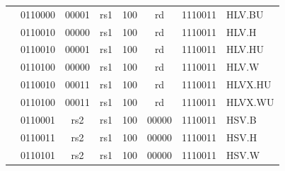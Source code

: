 \documentclass{../runikraft-report}
\begin{document}
{\begin{longtable}{p{0in}p{0.4in}p{0.05in}p{0.05in}p{0.05in}p{0.05in}p{0.4in}p{0.6in}p{0.4in}p{0.6in}p{0.7in}l}
    &
    \multicolumn{4}{|c|}{0110000} &
    \multicolumn{2}{c|}{00001} &
    \multicolumn{1}{c|}{rs1} &
    \multicolumn{1}{c|}{100} &
    \multicolumn{1}{c|}{rd} &
    \multicolumn{1}{c|}{1110011} & HLV.BU \\
    \cline{2-11}


    &
    \multicolumn{4}{|c|}{0110010} &
    \multicolumn{2}{c|}{00000} &
    \multicolumn{1}{c|}{rs1} &
    \multicolumn{1}{c|}{100} &
    \multicolumn{1}{c|}{rd} &
    \multicolumn{1}{c|}{1110011} & HLV.H \\
    \cline{2-11}


    &
    \multicolumn{4}{|c|}{0110010} &
    \multicolumn{2}{c|}{00001} &
    \multicolumn{1}{c|}{rs1} &
    \multicolumn{1}{c|}{100} &
    \multicolumn{1}{c|}{rd} &
    \multicolumn{1}{c|}{1110011} & HLV.HU \\
    \cline{2-11}


    &
    \multicolumn{4}{|c|}{0110100} &
    \multicolumn{2}{c|}{00000} &
    \multicolumn{1}{c|}{rs1} &
    \multicolumn{1}{c|}{100} &
    \multicolumn{1}{c|}{rd} &
    \multicolumn{1}{c|}{1110011} & HLV.W \\
    \cline{2-11}


    &
    \multicolumn{4}{|c|}{0110010} &
    \multicolumn{2}{c|}{00011} &
    \multicolumn{1}{c|}{rs1} &
    \multicolumn{1}{c|}{100} &
    \multicolumn{1}{c|}{rd} &
    \multicolumn{1}{c|}{1110011} & HLVX.HU \\
    \cline{2-11}


    &
    \multicolumn{4}{|c|}{0110100} &
    \multicolumn{2}{c|}{00011} &
    \multicolumn{1}{c|}{rs1} &
    \multicolumn{1}{c|}{100} &
    \multicolumn{1}{c|}{rd} &
    \multicolumn{1}{c|}{1110011} & HLVX.WU \\
    \cline{2-11}


    &
    \multicolumn{4}{|c|}{0110001} &
    \multicolumn{2}{c|}{rs2} &
    \multicolumn{1}{c|}{rs1} &
    \multicolumn{1}{c|}{100} &
    \multicolumn{1}{c|}{00000} &
    \multicolumn{1}{c|}{1110011} & HSV.B \\
    \cline{2-11}


    &
    \multicolumn{4}{|c|}{0110011} &
    \multicolumn{2}{c|}{rs2} &
    \multicolumn{1}{c|}{rs1} &
    \multicolumn{1}{c|}{100} &
    \multicolumn{1}{c|}{00000} &
    \multicolumn{1}{c|}{1110011} & HSV.H \\
    \cline{2-11}


    &
    \multicolumn{4}{|c|}{0110101} &
    \multicolumn{2}{c|}{rs2} &
    \multicolumn{1}{c|}{rs1} &
    \multicolumn{1}{c|}{100} &
    \multicolumn{1}{c|}{00000} &
    \multicolumn{1}{c|}{1110011} & HSV.W \\
    \cline{2-11}



\end{longtable}}
\end{document}
